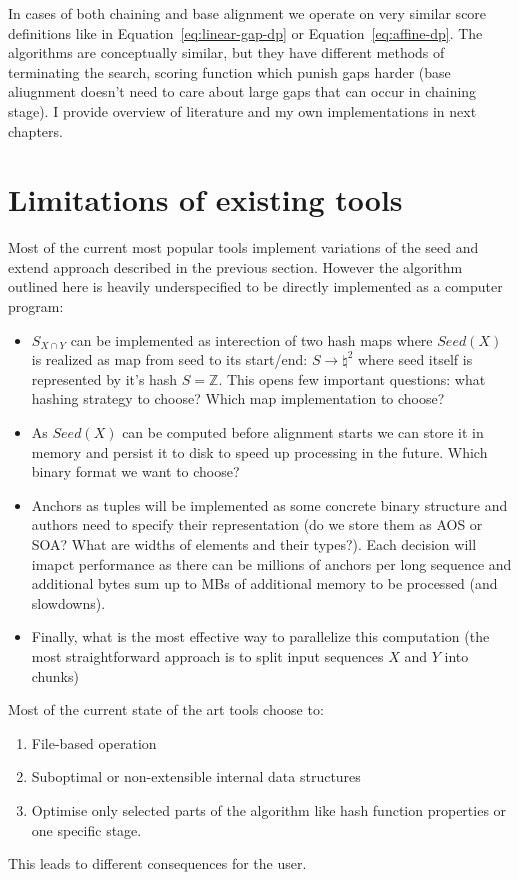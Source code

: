 In cases of both chaining and base alignment we operate on very similar score definitions like in Equation~\ref{eq:linear-gap-dp} or Equation~\ref{eq:affine-dp}.
The algorithms are conceptually similar, but they have different methods of terminating the search, scoring function which punish gaps harder (base aliugnment doesn't need to care about large gaps that can occur in chaining stage).
I provide overview of literature and my own implementations in next chapters.

\section{Limitations of existing tools}
\label{sec:limitations-existing-tools}

Most of the current most popular tools implement variations of the seed and extend approach described in the previous section. However the algorithm outlined here is heavily underspecified to be directly implemented as a computer program:
\begin{itemize}
  \item $S_{X \cap Y}$ can be implemented as interection of two hash maps where $Seed(X)$ is realized as map from seed to its start/end: $S \rightarrow \natural^2$ where seed itself is represented by it's hash $S = \mathbb{Z}$. This opens few important questions: what hashing strategy to choose? Which map implementation to choose?
  \item As $Seed(X)$ can be computed before alignment starts we can store it in memory and persist it to disk to speed up processing in the future. Which binary format we want to choose?
  \item Anchors as tuples will be implemented as some concrete binary structure and authors need to specify their representation (do we store them as AOS or SOA? What are widths of elements and their types?). Each decision will imapct performance as there can be millions of anchors per long sequence and additional bytes sum up to MBs of additional memory to be processed (and slowdowns).
  \item Finally, what is the most effective way to parallelize this computation (the most straightforward approach is to split input sequences $X$ and $Y$ into chunks)
\end{itemize}

Most of the current state of the art tools choose to:
\begin{enumerate}
  \item File-based operation
  \item Suboptimal or non-extensible internal data structures
  \item Optimise only selected parts of the algorithm like hash function properties or one specific stage.
\end{enumerate}
This leads to different consequences for the user.

